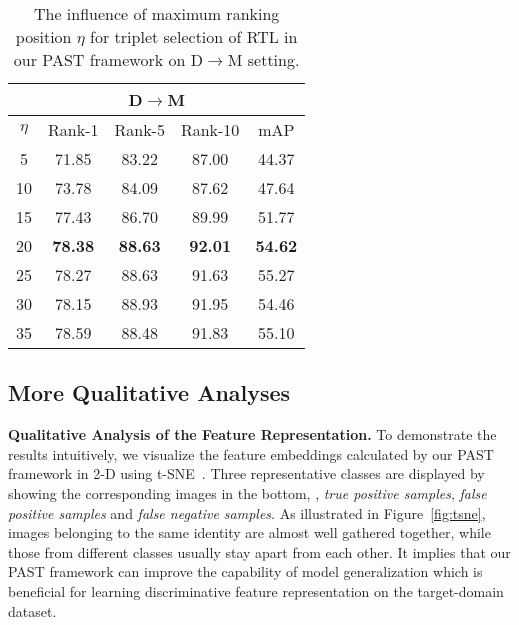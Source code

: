 \documentclass[10pt,twocolumn,letterpaper]{article}
\begin{document}
\begin{table}[b]
\setlength{\belowcaptionskip}{-0.1cm}
\setlength{\abovecaptionskip}{-0.2cm} 
\begin{center}
\begin{tabular}{ccccc}
\hline
\multicolumn{5}{c}{D$\rightarrow$M}                                         \\ \hline \hline
\multicolumn{1}{c|}{$\eta$} & \multicolumn{1}{c|}{Rank-1} & \multicolumn{1}{c|}{Rank-5} & \multicolumn{1}{c|}{Rank-10} & \multicolumn{1}{c}{mAP}   \\ \hline
\multicolumn{1}{c|}{5}  & \multicolumn{1}{c|}{71.85}  & \multicolumn{1}{c|}{83.22}  & \multicolumn{1}{c|}{87.00}   & 44.37 \\
\multicolumn{1}{c|}{10} & \multicolumn{1}{c|}{73.78}  & \multicolumn{1}{c|}{84.09}  & \multicolumn{1}{c|}{87.62}   & 47.64 \\
\multicolumn{1}{c|}{15} & \multicolumn{1}{c|}{77.43} & \multicolumn{1}{c|}{86.70}  & \multicolumn{1}{c|}{89.99}   & 51.77 \\
\multicolumn{1}{c|}{20} & \multicolumn{1}{c|}{\textbf{78.38}}  & \multicolumn{1}{c|}{\textbf{88.63}}  & \multicolumn{1}{c|}{\textbf{92.01}}   & \textbf{54.62}  \\
\multicolumn{1}{c|}{25} & \multicolumn{1}{c|}{78.27} & \multicolumn{1}{c|}{88.63}  & \multicolumn{1}{c|}{91.63}   & 55.27 \\
\multicolumn{1}{c|}{30} & \multicolumn{1}{c|}{78.15}  & \multicolumn{1}{c|}{88.93}  & \multicolumn{1}{c|}{91.95}   & 54.46 \\
\multicolumn{1}{c|}{35} & \multicolumn{1}{c|}{78.59}  & \multicolumn{1}{c|}{88.48}  & \multicolumn{1}{c|}{91.83}   & 55.10 \\ \hline
\end{tabular}
\end{center}
\caption{The influence of maximum ranking position $\eta$ for triplet selection of RTL in our PAST framework on D$\rightarrow$M setting.}
\label{fig:position}
\end{table}


\subsection{More Qualitative Analyses}
\textbf{Qualitative Analysis of the Feature Representation.}
To demonstrate the results intuitively, we visualize the feature embeddings calculated by our PAST framework in 2-D using t-SNE~\cite{tsne}. Three representative classes are displayed by showing the corresponding images in the bottom, \ie, \textit{true positive samples}, \textit{false positive samples} and \textit{false negative samples}. As illustrated in Figure~\ref{fig:tsne}, images belonging to the same identity are almost well gathered together, while those from different classes usually stay apart from each other. It implies that our PAST framework can improve the capability of model generalization which is beneficial for learning discriminative feature representation on the target-domain dataset.
\end{document}
